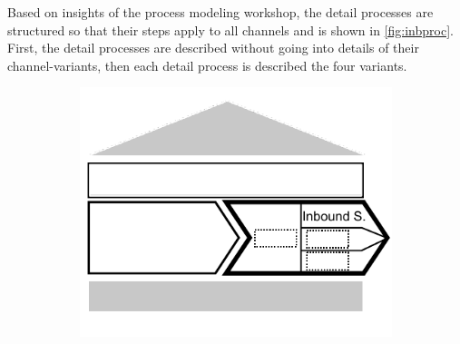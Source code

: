 	 Based on insights of the process modeling workshop, the detail processes are structured so that their steps apply to all channels and is shown in \Fig \ref{fig:inbproc}. First, the detail processes are described without going into details of their channel-variants, then each detail process is described \wrt the four variants. 
	 
	 \begin{figure}[caption={\textsc{Inbound Service} Process}, label={fig:inbproc}]
	 	\begin{subfigure}[b]{.45\textwidth}
	 		\begin{center}
	 			\includegraphics{figures/processes/inbound.pdf}
	 		\end{center}
	 	\end{subfigure}
	 	\begin{subfigure}[b]{.45\textwidth}
	 		\begin{center}
	 		\end{center}
	 	\end{subfigure}
	 	
	 \end{figure}
	 
